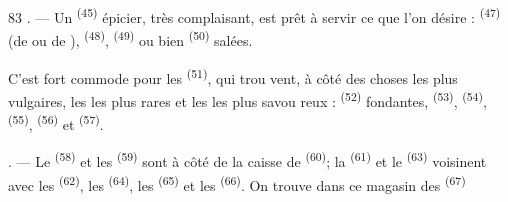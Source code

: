\begin{VUpage}[85]{83}
. --- Un  \textsuperscript{(45)} épicier, très complaisant, est\nl
prêt à servir ce que l'on désire :  \textsuperscript{(47)} (de\nl
{} ou de ),  \textsuperscript{(48)},  \textsuperscript{(49)}\nl
ou bien  \textsuperscript{(50)} salées.

C'est fort commode pour les  \textsuperscript{(51)}, qui trou\cc
vent, à côté des choses les plus vulgaires, les \cc
{} les plus rares et les  les plus savou\cc
reux :  \textsuperscript{(52)} fondantes,  \textsuperscript{(53)},  \textsuperscript{(54)},\nl
{} \textsuperscript{(55)},  \textsuperscript{(56)} et  \textsuperscript{(57)}.

. --- Le  \textsuperscript{(58)} et les  \textsuperscript{(59)} sont à côté de\nl
la caisse de  \textsuperscript{(60)}; la \nl
{} \textsuperscript{(61)} et le  \textsuperscript{(63)} voisinent avec les \cc
{} \textsuperscript{(62)}, les  \textsuperscript{(64)}, les  \textsuperscript{(65)} et les\nl
{} \textsuperscript{(66)}. On trouve dans ce magasin des  \textsuperscript{(67)}
\parplein
\end{VUpage}

